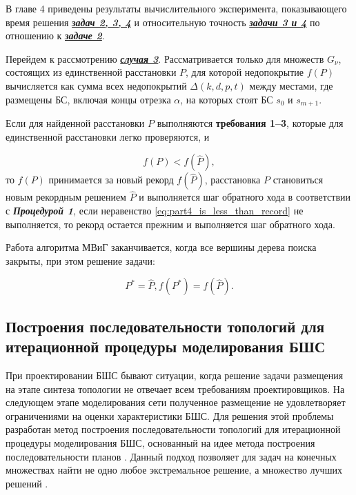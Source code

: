 В главе 4 приведены результаты вычислительного эксперимента, показывающего время решения \underline{\textit{\textbf{задач 2, 3, 4}}} и относительную точность \underline{\textit{\textbf{задачи 3 и 4}}} по отношению к \underline{\textit{\textbf{задаче 2}}}.

Перейдем к рассмотрению \underline{\textit{\textbf{случая 3}}}. Рассматривается только для множеств $G_\nu$, состоящих из единственной расстановки $P$, для которой недопокрытие $f(P)$ вычисляется как сумма всех недопокрытий $\Delta(k,d,p,t)$ между местами, где размещены БС, включая концы отрезка $\alpha$, на которых стоят БС $s_0$ и $s_{m+1}$. 

Если для найденной расстановки $P$ выполняются \textbf{требования 1--3}, которые для единственной расстановки легко проверяются, и

\begin{equation}
    \label{eq:part4_is_less_than_record}
    f(P) < f(\widehat{P}),
\end{equation}
то $f(P)$ принимается за новый рекорд $f(\widehat{P})$, расстановка $P$ становиться новым рекордным решением $\widehat{P}$ и выполняется шаг обратного хода в соответствии с \textit{\textbf{Процедурой 1}}, если неравенство \cref{eq:part4_is_less_than_record} не выполняется, то рекорд остается прежним и выполняется шаг обратного хода.

Работа алгоритма МВиГ заканчивается, когда все вершины дерева поиска закрыты, при этом решение задачи: 

\begin{displaymath}
    P^{*} = \widehat{P},  f(P^*) = f(\widehat{P}).
\end{displaymath}

\subsection{Построения последовательности топологий для итерационной процедуры моделирования БШС}

При проектировании БШС бывают ситуации, когда решение задачи размещения на этапе синтеза топологии не отвечает всем требованиям проектировщиков. На следующем этапе моделирования сети полученное размещение не удовлетворяет ограничениями на оценки характеристики БШС. Для решения этой проблемы разработан метод построения последовательности топологий для итерационной процедуры моделирования БШС, основанный на идее метода построения последовательности планов \cite{Emelichev}. Данный подход позволяет для задач на конечных множествах найти не одно любое экстремальное решение, а множество лучших решений \cite{Pershin1999, Pershin2002}.

